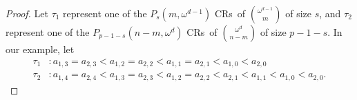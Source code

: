 \documentclass[10pt,a4paper]{article}
\newcommand{\om}{\omega}
\newcommand{\crulenospace}{CR}
\newcommand{\crules}{\crulenospace s~}
\newcommand{\numpoints}{n}
\newcommand{\commonconst}{a}
\theoremstyle{plain}
\theoremstyle{definition}
\begin{document}
\begin{proof}
Let $\tau_1$ represent one of the $P_s\left(m, \om^{d-1}\right)$ \crules of $\binom{\om^{d-1}}{m}$ of size $s$, and $\tau_2$ represent one of the $P_{p-1-s}\left(\numpoints-m, \om^d\right)$ \crules of $\binom{\om^{d}}{\numpoints-m}$ of size $p-1-s$. In our example, let \begin{align*}
\tau_1 & \colon \commonconst_{1,3} = \commonconst_{2,3} < \commonconst_{1,2} = \commonconst_{2,2} < \commonconst_{1,1} = \commonconst_{2,1} < \commonconst_{1,0} < \commonconst_{2,0}\\
\tau_2 & \colon \commonconst_{1,4} = \commonconst_{2,4} < \commonconst_{1,3} = \commonconst_{2,3} < \commonconst_{1,2} = \commonconst_{2,2} < \commonconst_{2,1} < \commonconst_{1,1} < \commonconst_{1,0} < \commonconst_{2,0}.
\end{align*}


\end{proof}
\end{document}
